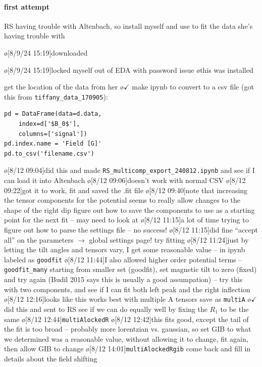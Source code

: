 \paragraph{first attempt}
RS having trouble with Altenbach, so install myself and use to fit the
data she's having trouble with
\par
\o[8/9/24 15:19]{downloaded}
\begin{err}
    \o[8/9/24 15:19]{locked myself out of EDA with password issue}
    \o{this was installed}
\end{err}
get the location of the data from her
\o{$\checkmark$}
make ipynb to convert to a csv file (got this from \texttt{tiffany_data_170905}):
\begin{verbatim}
pd = DataFrame(data=d.data,
    index=d['$B_0$'],
    columns=['signal'])
pd.index.name = 'Field [G]'
pd.to_csv('filename.csv')
\end{verbatim}
\o[8/12 09:04]{did this and made \texttt{RS_multicomp_export_240812.ipynb}}
and see if I can load it into Altenbach
\o[8/12 09:06]{doesn't work with normal CSV}
\o[8/12 09:22]{got it to work, fit and saved the .fit file}
\o[8/12 09:40]{note that increasing the tensor components for the potential seems to really allow changes to the shape of the right dip}
figure out how to save the components to use as a starting point for the next fit
-- may need to look at \cite{Pan2021SitSpiLab} 
\o[8/12 11:15]{a lot of time trying to figure out how to parse the settings file -- no success!}
\o[8/12 11:15]{did fine ``accept all'' on the parameters $\rightarrow$ global settings page!}
try fitting
\o[8/12 11:24]{just by letting the tilt angles and tensors vary, I get some reasonable value -- in ipynb labeled as \texttt{goodfit}}
\o[8/12 11:44]{I also allowed higher order potential terms -- \texttt{goodfit_many}}
starting from smaller set (goodfit), set magnetic tilt to zero (fixed) and try again (Budil 2015 says this is usually a good assumpation)
-- try this with two components, and see if I can fit both left peak and the right inflection
\o[8/12 12:16]{looks like this works best with multiple A tensors}
save as \texttt{multiA}
\o{$\checkmark$ did this and sent to RS}
see if we can do equally well by fixing the $R_1$ to be the same
\o[8/12 12:44]{\texttt{multiAlockedR}}
\o[8/12 12:42]{this fits good, except the tail of the fit is too broad -- probably more lorentzian vs. gaussian, so}
set GIB to what we determined was a reasonable value, without allowing it to change, fit again, then allow GIB to change
\o[8/12 14:01]{\texttt{multiAlockedRgib}}
come back and fill in details about the field shifting
